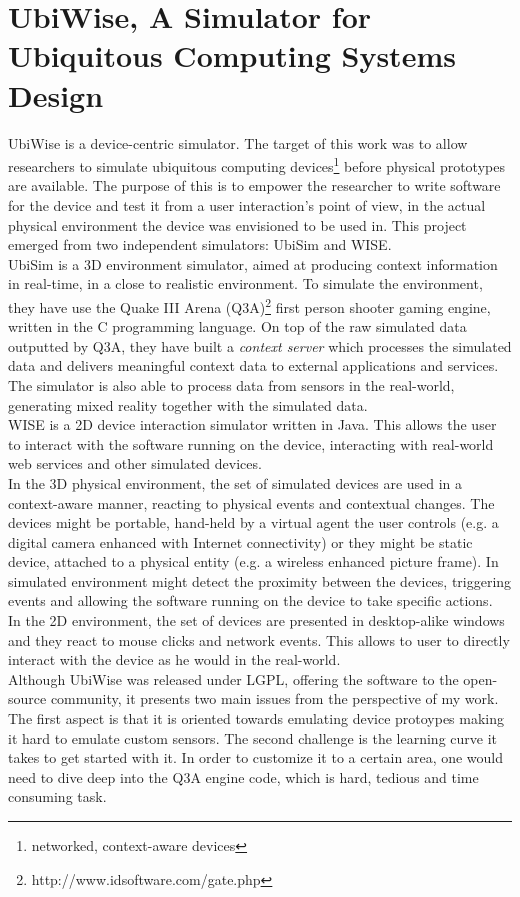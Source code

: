 \section{UbiWise, A Simulator for Ubiquitous Computing Systems Design}\label{sec:ubiwise}

UbiWise \cite{barton2003ubiwise} is a device-centric simulator. The target of this work was to allow researchers to simulate ubiquitous computing devices\footnote{networked, context-aware devices} before physical prototypes are available. The purpose of this is to empower the researcher to write software for the device and test it from a user interaction's point of view, in the actual physical environment the device was envisioned to be used in. This project emerged from two independent simulators: UbiSim and WISE.\\

UbiSim is a 3D environment simulator, aimed at producing context information in real-time, in a close to realistic environment. To simulate the environment, they have use the Quake III Arena (Q3A)\footnote{http://www.idsoftware.com/gate.php} first person shooter gaming engine, written in the C programming language. On top of the raw simulated data outputted by Q3A, they have built a \emph{context server} which processes the simulated data and delivers meaningful context data to external applications and services. The simulator is also able to process data from sensors in the real-world, generating mixed reality together with the simulated data.\\

WISE is a 2D device interaction simulator written in Java. This allows the user to interact with the software running on the device, interacting with real-world web services and other simulated devices.\\

In the 3D physical environment, the set of simulated devices are used in a context-aware manner, reacting to physical events and contextual changes. The devices might be portable, hand-held by a virtual agent the user controls (e.g. a digital camera enhanced with Internet connectivity) or they might be static device, attached to a physical entity (e.g. a wireless enhanced picture frame). In simulated environment might detect the proximity between the devices, triggering events and allowing the software running on the device to take specific actions.\\

In the 2D environment, the set of devices are presented in desktop-alike windows and they react to mouse clicks and network events. This allows to user to directly interact with the device as he would in the real-world.\\

Although UbiWise was released under LGPL\cite{lgpl}, offering the software to the open-source community, it presents two main issues from the perspective of my work. The first aspect is that it is oriented towards emulating device protoypes making it hard to emulate custom sensors. The second challenge is the learning curve it takes to get started with it. In order to customize it to a certain area, one would need to dive deep into the Q3A engine code, which is hard, tedious and time consuming task.   
